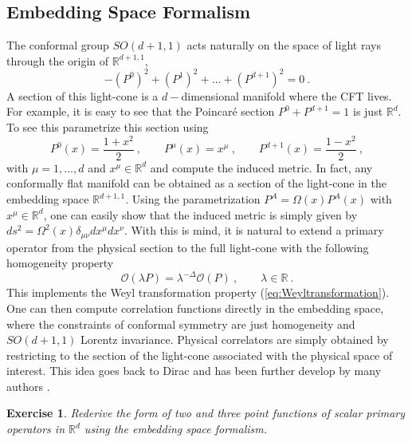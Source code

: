 \documentclass{ws-rv9x6}
\newtheorem{exercise}{Exercise}[section]
\newcommand\be{\begin{equation}}
\newcommand\ee{\end{equation}}
\begin{document}
\subsection{Embedding Space Formalism\label{sub:Embedding-Space-Formalism}}

The conformal group $SO(d+1,1)$ acts naturally on the space of light
rays through the origin of $\mathbb{R}^{d+1,1}$,
\be
-\left(P^{0}\right)^{2}+\left(P^{1}\right)^{2}+\dots+\left(P^{d+1}\right)^{2}=0\ .
\ee
A section of this light-cone is a $d-$dimensional manifold where
the CFT lives. For example, it is easy to see that the Poincaré section
$P^{0}+P^{d+1}=1$ is just $\mathbb{R}^{d}$. To see this parametrize
this section using
\begin{equation}
P^{0}(x)=\frac{1+x^{2}}{2}\ ,\qquad P^{\mu}(x)=x^{\mu}\ ,\qquad P^{d+1}(x)=\frac{1-x^{2}}{2}\ ,\label{eq:boundAdSPoincareEmb}
\end{equation}
with $\mu=1,\dots,d$ and $x^{\mu}\in\mathbb{R}^{d}$ and compute
the induced metric. In fact, any conformally flat manifold can be
obtained as a section of the light-cone in the embedding space $\mathbb{R}^{d+1,1}$.
Using the parametrization $P^{A}=\Omega(x)P^{A}(x)$ with $x^{\mu}\in\mathbb{R}^{d}$,
one can easily show that the induced metric is simply given by $ds^{2}=\Omega^{2}(x)\delta_{\mu\nu}dx^{\mu}dx^{\nu}$.
With this is mind, it is natural to extend a primary operator from
the physical section to the full light-cone with the following homogeneity
property
\begin{equation}
\mathcal{O}(\lambda P)=\lambda^{-\Delta}\mathcal{O}(P)\ ,\qquad\lambda\in\mathbb{R}\ .\label{eq:EmbHomogeneity}
\end{equation}
This implements the Weyl transformation property (\ref{eq:Weyltransformation}).
One can then compute correlation functions directly in the embedding
space, where the constraints of conformal symmetry are just homogeneity
and $SO(d+1,1)$ Lorentz invariance. Physical correlators are simply
obtained by restricting to the section of the light-cone associated
with the physical space of interest.
This idea goes back to Dirac \cite{Dirac:1936fq} and has been further develop by many authors \cite{Mack:1969rr, Boulware:1970ty, Ferrara:1973eg, Ferrara:1973yt, Cornalba:2009ax, Weinberg:2010fx, Costa:2011mg}.

\begin{exercise} Rederive the form of two and three point functions
of scalar primary operators in $\mathbb{R}^{d}$ using the embedding
space formalism.
\end{exercise} 
\end{document}
